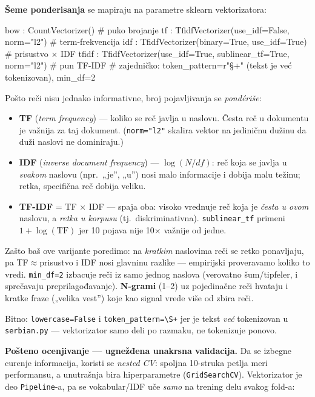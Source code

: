 \documentclass[11pt,a4paper]{article}
\newcommand{\kod}[1]{\texttt{#1}}
\begin{document}
\textbf{Šeme ponderisanja} se mapiraju na parametre sklearn vektorizatora:
\begin{code}
bow   : CountVectorizer()                              # puko brojanje
tf    : TfidfVectorizer(use_idf=False, norm="l2")      # term-frekvencija
idf   : TfidfVectorizer(binary=True, use_idf=True)     # prisustvo × IDF
tfidf : TfidfVectorizer(use_idf=True, sublinear_tf=True, norm="l2")  # pun TF-IDF
# zajedničko: token_pattern=r"\S+"  (tekst je već tokenizovan), min_df=2
\end{code}
\begin{teorija}
Pošto reči nisu jednako informativne, broj pojavljivanja se \emph{pondériše}:
\begin{itemize}[nosep]
  \item \textbf{TF} (\emph{term frequency}) --- koliko se reč javlja u naslovu. Česta
    reč u dokumentu je važnija za taj dokument. (\kod{norm="l2"} skalira vektor na
    jediničnu dužinu da duži naslovi ne dominiraju.)
  \item \textbf{IDF} (\emph{inverse document frequency}) --- $\log(N/df)$: reč koja se
    javlja u \emph{svakom} naslovu (npr.\ „je'', „u'') nosi malo informacije i dobija
    malu težinu; retka, specifična reč dobija veliku.
  \item \textbf{TF-IDF} = TF $\times$ IDF --- spaja oba: visoko vrednuje reč koja je
    \emph{česta u ovom} naslovu, a \emph{retka u korpusu} (tj.\ diskriminativna).
    \kod{sublinear\_tf} primeni $1+\log(\mathrm{TF})$ jer 10 pojava nije 10$\times$
    važnije od jedne.
\end{itemize}
Zašto baš ove varijante poredimo: na \emph{kratkim} naslovima reči se retko ponavljaju,
pa TF$\approx$prisustvo i IDF nosi glavninu razlike --- empirijski proveravamo koliko
to vredi. \kod{min\_df=2} izbacuje reči iz samo jednog naslova (verovatno šum/tipfeler,
i sprečavaju preprilagođavanje). \textbf{N-grami} (1--2) uz pojedinačne reči hvataju i
kratke fraze („velika vest'') koje kao signal vrede više od zbira reči.
\end{teorija}
Bitno: \kod{lowercase=False} i \kod{token\_pattern=\textbackslash S+} jer je tekst
\emph{već} tokenizovan u \kod{serbian.py} --- vektorizator samo deli po razmaku, ne
tokenizuje ponovo.

\textbf{Pošteno ocenjivanje --- ugnežđena unakrsna validacija.} Da se izbegne curenje
informacija, koristi se \emph{nested CV}: spoljna 10-struka petlja meri performansu, a
unutrašnja bira hiperparametre (\kod{GridSearchCV}). Vektorizator je deo
\kod{Pipeline}-a, pa se vokabular/IDF uče \emph{samo} na trening delu svakog fold-a:
\end{document}
